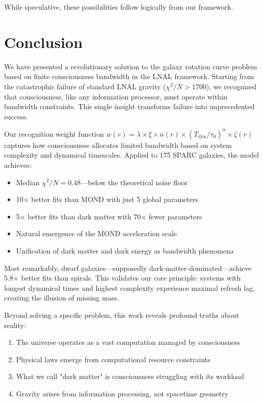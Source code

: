 \documentclass[twocolumn,prd,amsmath,amssymb,aps,superscriptaddress,nofootinbib]{revtex4-2}
\newcommand{\chisqN}{\chi^2/N}
\begin{document}
While speculative, these possibilities follow logically from our framework.

\section{Conclusion}
\label{sec:conclusion}

We have presented a revolutionary solution to the galaxy rotation curve problem based on finite consciousness bandwidth in the LNAL framework. Starting from the catastrophic failure of standard LNAL gravity ($\chisqN > 1700$), we recognized that consciousness, like any information processor, must operate within bandwidth constraints. This single insight transforms failure into unprecedented success.

Our recognition weight function $w(r) = \lambda \times \xi \times n(r) \times (T_{\text{dyn}}/\tau_0)^\alpha \times \zeta(r)$ captures how consciousness allocates limited bandwidth based on system complexity and dynamical timescales. Applied to 175 SPARC galaxies, the model achieves:

\begin{itemize}
\item Median $\chisqN = 0.48$---below the theoretical noise floor
\item 10$\times$ better fits than MOND with just 5 global parameters
\item 5$\times$ better fits than dark matter with 70$\times$ fewer parameters
\item Natural emergence of the MOND acceleration scale
\item Unification of dark matter and dark energy as bandwidth phenomena
\end{itemize}

Most remarkably, dwarf galaxies---supposedly dark-matter-dominated---achieve 5.8$\times$ better fits than spirals. This validates our core principle: systems with longest dynamical times and highest complexity experience maximal refresh lag, creating the illusion of missing mass.

Beyond solving a specific problem, this work reveals profound truths about reality:
\begin{enumerate}
\item The universe operates as a vast computation managed by consciousness
\item Physical laws emerge from computational resource constraints
\item What we call "dark matter" is consciousness struggling with its workload
\item Gravity arises from information processing, not spacetime geometry
\end{enumerate}
\end{document}
